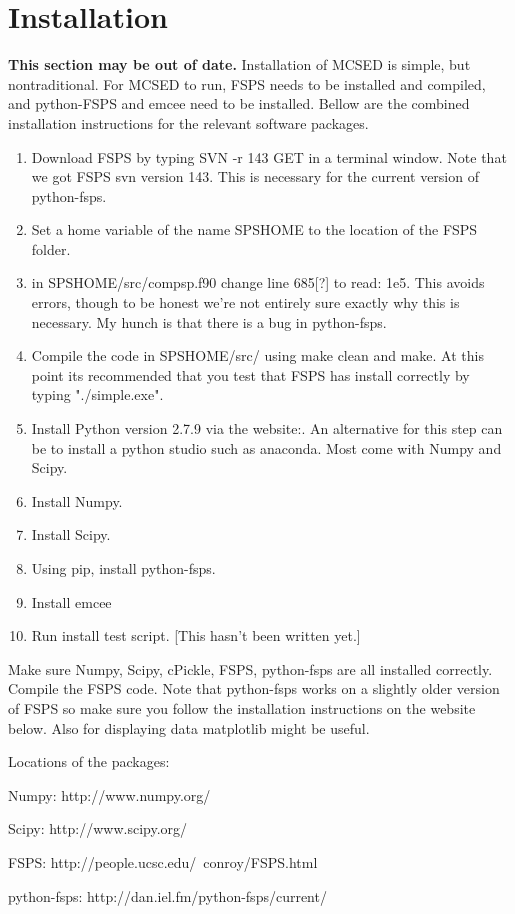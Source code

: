 \documentclass[12pt,a4paper]{article}
\begin{document}
\section{Installation}

\textbf{This section may be out of date.}  Installation of MCSED is simple, but nontraditional.  For MCSED to run, FSPS needs to be installed and compiled, and python-FSPS and emcee need to be installed.  Bellow are the combined installation instructions for the relevant software packages.   

\begin{enumerate}
\item Download FSPS by typing SVN -r 143 GET in a terminal window.  Note that we got FSPS svn version 143.  This is necessary for the current version of python-fsps.
\item Set a home variable of the name SPSHOME to the location of the FSPS folder.
\item in SPSHOME/src/compsp.f90 change line 685[?] to read: 1e5.  This avoids errors, though to be honest we're not entirely sure exactly why this is necessary.  My hunch is that there is a bug in python-fsps.  
\item Compile the code in SPSHOME/src/ using make clean and make.  At this point its recommended that you test that FSPS has install correctly by typing "./simple.exe".
\item Install Python version 2.7.9 via the website:.  An alternative for this step can be to install a python studio such as anaconda.  Most come with Numpy and Scipy.
\item Install Numpy.  
\item Install Scipy.
\item Using pip, install python-fsps.
\item Install emcee
\item Run install test script. [This hasn't been written yet.]

\end{enumerate}


Make sure Numpy, Scipy, cPickle, FSPS, python-fsps are all installed correctly. Compile the FSPS  code.  Note that python-fsps works on a slightly older version of FSPS so make sure you follow the installation instructions on the website below.  Also for displaying data matplotlib might be useful.  

Locations of the packages: 


\begin{centering}

Numpy: http://www.numpy.org/ 

Scipy: http://www.scipy.org/

FSPS: http://people.ucsc.edu/~conroy/FSPS.html

python-fsps: http://dan.iel.fm/python-fsps/current/

\end{centering}
\end{document}
